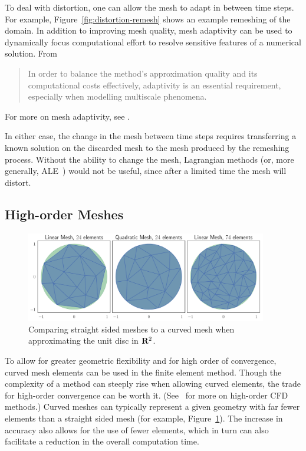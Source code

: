 To deal with distortion, one can allow the mesh to adapt in between time
steps. For example, Figure~\ref{fig:distortion-remesh} shows an example
remeshing of the domain.
In addition to improving mesh quality, mesh
adaptivity can be used to dynamically focus computational effort to resolve
sensitive features of a numerical solution. From~\cite{Iske2004}
\begin{quote}
{\small In order to balance the method's approximation quality and its
computational costs effectively, adaptivity is an essential requirement,
especially when modelling multiscale phenomena.}
\end{quote}
For more on mesh adaptivity, see \cite{Babuska1978, Peraire1987, Pain2001}.

In either case, the change in the
mesh between time steps requires transferring a known solution on the
discarded mesh to the mesh produced by the remeshing process. Without
the ability to change the mesh, Lagrangian methods (or, more generally,
ALE~\cite{Hirt1974}) would not be useful, since after a limited time the
mesh will distort.

\subsection{High-order Meshes}

\begin{figure}
  \includegraphics[width=0.9375\textwidth]
                  {../images/curved-mesh/main_figure27.pdf}
  \centering
  \captionsetup{width=.75\linewidth}
  \caption{Comparing straight sided meshes to a curved mesh when approximating
    the unit disc in \(\mathbf{R}^2\).}
  \label{fig:curved-vs-straight-mesh}
\end{figure}

To allow for greater geometric flexibility and for high order of convergence,
curved mesh elements can be used in the finite element method. Though the
complexity of a method can steeply rise when allowing curved elements, the
trade for high-order convergence can be worth it. (See~\cite{Wang2013} for
more on high-order CFD methods.) Curved meshes can typically
represent a given geometry with far fewer elements than a straight sided mesh
(for example, Figure~\ref{fig:curved-vs-straight-mesh}).
The increase in accuracy also allows for the use of fewer elements, which
in turn can also facilitate a reduction in the overall computation time.

